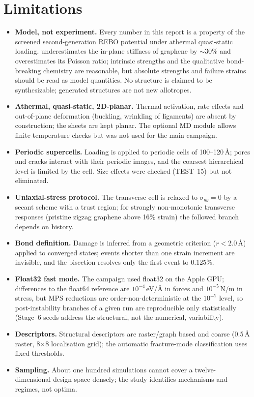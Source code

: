 \section{Limitations}
\begin{itemize}
\item \textbf{Model, not experiment.} Every number in this report is a property of the screened second-generation REBO potential under athermal quasi-static loading. \rebo{} underestimates the in-plane stiffness of graphene by $\sim$30\% and overestimates its Poisson ratio; intrinsic strengths and the qualitative bond-breaking chemistry are reasonable, but absolute strengths and failure strains should be read as model quantities. No structure is claimed to be synthesizable; generated structures are not new allotropes.
\item \textbf{Athermal, quasi-static, 2D-planar.} Thermal activation, rate effects and out-of-plane deformation (buckling, wrinkling of ligaments) are absent by construction; the sheets are kept planar. The optional MD module allows finite-temperature checks but was not used for the main campaign.
\item \textbf{Periodic supercells.} Loading is applied to periodic cells of 100--120\,\AA; pores and cracks interact with their periodic images, and the coarsest hierarchical level is limited by the cell. Size effects were checked (TEST~15) but not eliminated.
\item \textbf{Uniaxial-stress protocol.} The transverse cell is relaxed to $\sigma_{yy}=0$ by a secant scheme with a trust region; for strongly non-monotonic transverse responses (pristine zigzag graphene above 16\% strain) the followed branch depends on history.
\item \textbf{Bond definition.} Damage is inferred from a geometric criterion ($r<2.0$\,\AA) applied to converged states; events shorter than one strain increment are invisible, and the bisection resolves only the first event to 0.125\%.
\item \textbf{Float32 fast mode.} The campaign used float32 on the Apple GPU; differences to the float64 reference are $10^{-4}$\,eV/\AA{} in forces and $10^{-5}$\,N/m in stress, but MPS reductions are order-non-deterministic at the $10^{-7}$ level, so post-instability branches of a given run are reproducible only statistically (Stage~6 seeds address the structural, not the numerical, variability).
\item \textbf{Descriptors.} Structural descriptors are raster/graph based and coarse (0.5\,\AA{} raster, 8$\times$8 localisation grid); the automatic fracture-mode classification uses fixed thresholds.
\item \textbf{Sampling.} About one hundred simulations cannot cover a twelve-dimensional design space densely; the study identifies mechanisms and regimes, not optima.
\end{itemize}

